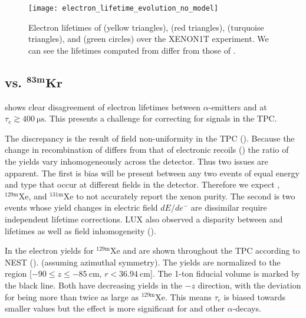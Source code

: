 \begin{figure}
\centering
\texttt{[image: electron\_lifetime\_evolution\_no\_model]}
\caption{Electron lifetimes of  (yellow triangles),  (red triangles),  (turquoise triangles), and
\metakr (green circles) over the
XENON1T experiment.  We can see the lifetimes computed from \alphadecays differ from those of \metakr.}
\label{fig:electron_lifetimes_evolution_no_model}
\end{figure}



\subsection{ vs. $\mathbf{^{83m}Kr}$}
\label{subsec:electron_lifetimes_rn222_vs_kr83m}
 shows clear disagreement of electron lifetimes between $\alpha$-emitters and \metakr
at $\tau_e \gtrsim 400\ \mathrm{\mu s}$.  This presents a challenge for correcting \stwob for signals in the TPC.

The discrepancy is the result of field non-uniformity in the TPC ().  Because the change in recombination
of \alphadecays differs from that of electronic recoils () the ratio of the \electron yields vary
inhomogeneously across the detector.  Thus two issues are apparent.  The first is bias will be present between any two events of equal
energy and type that occur at different fields in the detector.  Therefore we expect \metakr, $\mathrm{^{129m}Xe}$, and
$\mathrm{^{131m}Xe}$ to not accurately report the xenon purity.  The second is two events whose \electron yield changes in electric field
$dE/de^-$ are dissimilar require independent lifetime corrections.  LUX also observed a disparity between \metakr and 
lifetimes as well as field inhomogeneity ().

In  the electron yields for $\mathrm{^{129m}Xe}$ and 
are shown throughout the TPC according to NEST (). (assuming azimuthal symmetry).  The yields are normalized to the
region [$-90 \leq z \leq -85\ \mathrm{cm}$,
$r < 36.94\ \mathrm{cm}$].  The 1-ton fiducial volume is marked by the black line.  Both have decreasing yields in the $-z$ direction,
with the deviation for  being more than twice as large as $\mathrm{^{129m}Xe}$.  This means $\tau_e$ is biased towards
smaller values but the effect is more significant for  and other $\alpha$-decays.


